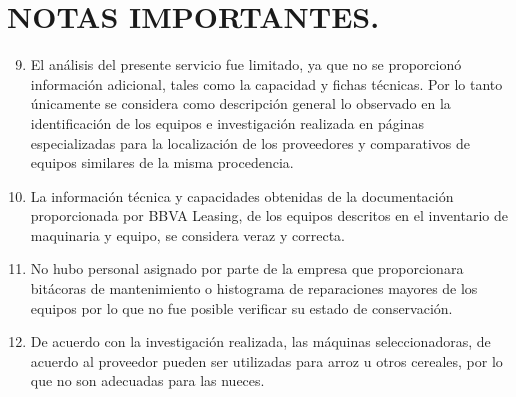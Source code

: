 \section{NOTAS IMPORTANTES.} %
\begin{enumerate}
\setcounter{enumi}{8}
\item El análisis del presente servicio fue limitado, ya que no se proporcionó información adicional, tales como la capacidad y fichas técnicas. 
	Por lo tanto únicamente se considera como descripción general lo observado en la identificación de los equipos e investigación realizada en páginas especializadas para la localización de los proveedores y  comparativos de equipos similares de la misma procedencia.
\item La información técnica y capacidades obtenidas de la documentación proporcionada por BBVA Leasing, de los equipos descritos en el inventario de maquinaria y equipo, se considera veraz y correcta.
\item No hubo personal asignado por parte de la empresa que proporcionara bitácoras de mantenimiento o histograma de reparaciones mayores de los equipos por lo que no fue posible verificar su estado de conservación.
\item De acuerdo con la investigación realizada, las máquinas seleccionadoras, de acuerdo al proveedor pueden ser utilizadas para arroz u otros cereales, por lo que no son adecuadas para las nueces.
\end{enumerate}

